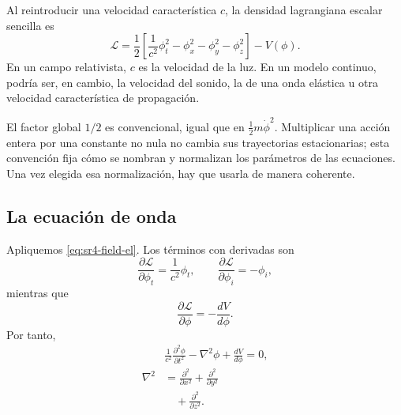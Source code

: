 Al reintroducir una velocidad característica \(c\), la densidad lagrangiana escalar sencilla es
\begin{equation}
\boxed{
\mathcal{L}
=
\frac12
\left[
\frac{1}{c^2}\phi_t^2
-\phi_x^2-\phi_y^2-\phi_z^2
\right]
-V(\phi)
}.
\label{eq:sr4-scalar-lagrangian}
\end{equation}
En un campo relativista, \(c\) es la velocidad de la luz. En un modelo continuo, podría ser, en cambio, la velocidad del sonido, la de una onda elástica u otra velocidad característica de propagación.

El factor global \(1/2\) es convencional, igual que en \(\tfrac12m\dot\phi^2\). Multiplicar una acción entera por una constante no nula no cambia sus trayectorias estacionarias; esta convención fija cómo se nombran y normalizan los parámetros de las ecuaciones. Una vez elegida esa normalización, hay que usarla de manera coherente.

\begin{classroomqa}
\end{classroomqa}

\subsection{La ecuación de onda}

Apliquemos \eqref{eq:sr4-field-el}. Los términos con derivadas son
\begin{equation}
\frac{\partial\mathcal{L}}{\partial\phi_t}
=\frac{1}{c^2}\phi_t,
\qquad
\frac{\partial\mathcal{L}}{\partial\phi_i}
=-\phi_i,
\end{equation}
mientras que
\begin{equation}
\frac{\partial\mathcal{L}}{\partial\phi}
=-\frac{dV}{d\phi}.
\end{equation}
Por tanto,
\begin{equation}
\begin{aligned}
&\boxed{
\frac{1}{c^2}\frac{\partial^2\phi}{\partial t^2}
-\nabla^2\phi
+\frac{dV}{d\phi}
=0
},\\[0.5em]
\nabla^2
&=
\frac{\partial^2}{\partial x^2}
+\frac{\partial^2}{\partial y^2}\\
&\quad
+\frac{\partial^2}{\partial z^2}.
\end{aligned}
\label{eq:sr4-general-scalar-eom}
\end{equation}

